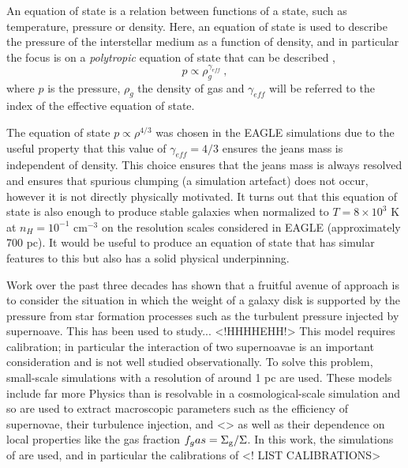 An equation of state is a relation between functions of a state, such as temperature, pressure or density. 
Here, an equation of state is used to describe the pressure of the interstellar medium as a function of density, and in particular the focus is on a \emph{polytropic} equation of state that can be described \citep{horedt_polytropes_2004},
\begin{equation}
\label{eqn:polytrope}
p \propto \rho_g ^ {\gamma_{eff}}~,
\end{equation}
where $p$ is the pressure, $\rho_g$ the density of gas and $\gamma_{eff}$ will be referred to the index of the effective equation of state.

The equation of state $p \propto \rho^{4/3}$ was chosen in the EAGLE simulations \citep{schaye_eagle_2015} due to the useful property that this value of $\gamma_{eff} = 4/3$ ensures the jeans mass is independent of density.
This choice ensures that the jeans mass is always resolved and ensures that spurious clumping (a simulation artefact) does not occur, however it is not directly physically motivated.
It turns out that this equation of state is also enough to produce stable galaxies when normalized to $T = 8\times 10^3$ K at $n_H = 10^{-1}$ cm$^{-3}$ on the resolution scales considered in EAGLE (approximately 700 pc).
It would be useful to produce an equation of state that has simular features to this but also has a solid physical underpinning.

Work over the past three decades has shown that a fruitful avenue of approach is to consider the situation in which the weight of a galaxy disk is supported by the pressure from star formation processes such as the turbulent pressure injected by supernoave. 
This has been used to study... <!HHHHEHH!>
This model requires calibration; in particular the interaction of two supernoavae is an important consideration and is not well studied observationally.
To solve this problem, small-scale simulations with a resolution of around 1 pc \citep{martizzi_supernova_2015} are used.
These models include far more Physics than is resolvable in a cosmological-scale simulation and so are used to extract macroscopic parameters such as the efficiency of supernovae, their turbulence injection, and <> as well as their dependence on local properties like the gas fraction $f_gas = \Sigma_\mathrm{g}/\Sigma$.
In this work, the simulations of \citet{martizzi_supernova_2015} are used, and in particular the calibrations of
<! LIST CALIBRATIONS>
